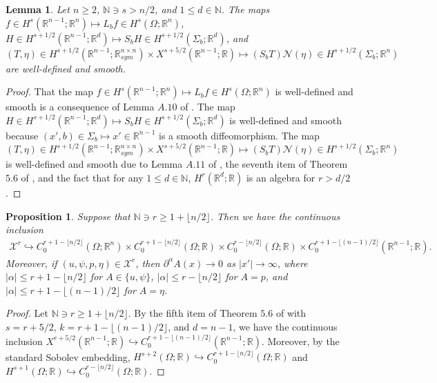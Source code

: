 \documentclass[11pt,letterpaper,reqno]{amsart}
\newtheorem{lemma}[theorem]{Lemma}
\newtheorem{proposition}[theorem]{Proposition}
\numberwithin{equation}{section}
\newcommand{\abs}[1]{\left\lvert#1\right\rvert}
\begin{document}
\begin{lemma} \label{ol4}
    Let \(n \geq 2\), \(\mathbb{N} \ni s >n/2\), and \(1 \leq d \in \mathbb{N}\). The maps \(f \in H^{s}(\mathbb{R}^{n-1};\mathbb{R}^{n}) \mapsto L_{b}f \in H^{s}(\Omega;\mathbb{R}^{n})\), \(H \in H^{s+1/2}(\mathbb{R}^{n-1};\mathbb{R}^{d})\mapsto S_{b}H \in H^{s+1/2}(\Sigma_{b};\mathbb{R}^{d})\), and \((T,\eta) \in H^{s+1/2}(\mathbb{R}^{n-1};\mathbb{R}_{sym}^{n \times n})\times X^{s+5/2}(\mathbb{R}^{n-1};\mathbb{R}) \mapsto (S_{b}T)\mathcal{N}(\eta) \in H^{s+1/2}(\Sigma_{b};\mathbb{R}^{n})\) are well-defined and smooth.
\end{lemma}
\begin{proof}
    That the map \(f \in H^{s}(\mathbb{R}^{n-1};\mathbb{R}^{n}) \mapsto L_{b}f \in H^{s}(\Omega;\mathbb{R}^{n})\) is well-defined and smooth is a consequence of Lemma \(A.10\) of \cite{leoni2023traveling}. The map \(H \in H^{s+1/2}(\mathbb{R}^{n-1};\mathbb{R}^{d})\mapsto S_{b}H \in H^{s+1/2}(\Sigma_{b};\mathbb{R}^{d})\) is well-defined and smooth because \((x',b) \in \Sigma_{b} \mapsto x' \in \mathbb{R}^{n-1}\) is a smooth diffeomorphism. The map \((T,\eta) \in H^{s+1/2}(\mathbb{R}^{n-1};\mathbb{R}_{sym}^{n \times n})\times X^{s+5/2}(\mathbb{R}^{n-1};\mathbb{R}) \mapsto (S_{b}T)\mathcal{N}(\eta) \in H^{s+1/2}(\Sigma_{b};\mathbb{R}^{n})\) is well-defined and smooth due to Lemma \(A.11\) of \cite{leoni2023traveling}, the seventh item of Theorem \(5.6\) of \cite{leoni2023traveling}, and the fact that for any \(1 \leq d \in \mathbb{N}\), \(H^{r}(\mathbb{R}^{d};\mathbb{R})\) is an algebra for \(r>d/2\).
\end{proof}
\begin{proposition}
    Suppose that \(\mathbb{N} \ni r \geq 1+ \lfloor n/2\rfloor\). Then we have the continuous inclusion
    \begin{align}
        \mathcal{X}^{r} \hookrightarrow C_{0}^{r+1-\lfloor n/2\rfloor}(\Omega;\mathbb{R}^{n}) \times C_{0}^{r+1-\lfloor n/2\rfloor}(\Omega;\mathbb{R}) \times C_{0}^{r-\lfloor n/2 \rfloor}(\Omega;\mathbb{R}) \times C_{0}^{r+1-\lfloor (n-1)/2\rfloor}(\mathbb{R}^{n-1};\mathbb{R}).
    \end{align}
    Moreover, if \((u,\psi,p,\eta) \in \mathcal{X}^{r}\), then $\partial^{\alpha}A(x) \to 0$ as $\abs{x'} \to \infty$, where  $\abs{\alpha} \le r+1-\lfloor n/2\rfloor$ for $A \in \{u,\psi\}$,  $\abs{\alpha}\le  r-\lfloor n/2\rfloor$ for $A=p$, and $\abs{\alpha}\le  r+1-\lfloor (n-1)/2\rfloor$ for $A=\eta$.
\end{proposition}
\begin{proof}
    Let \(\mathbb{N} \ni r \geq 1+ \lfloor n/2\rfloor\). By the fifth item of Theorem \(5.6\) of \cite{leoni2023traveling} with \(s=r+5/2\), \(k=r+1-\lfloor (n-1)/2\rfloor\), and \(d=n-1\), we have the continuous inclusion \(X^{r+5/2}(\mathbb{R}^{n-1};\mathbb{R}) \hookrightarrow C_{0}^{r+1-\lfloor (n-1)/2\rfloor}(\mathbb{R}^{n-1};\mathbb{R})\). Moreover, by the standard Sobolev embedding, \(H^{s+2}(\Omega;\mathbb{R}) \hookrightarrow C_{0}^{r+1-\lfloor n/2\rfloor}(\Omega;\mathbb{R})\) and \(H^{s+1}(\Omega;\mathbb{R})\hookrightarrow C_{0}^{r-\lfloor n/2 \rfloor}(\Omega;\mathbb{R})\).
\end{proof}
\end{document}
